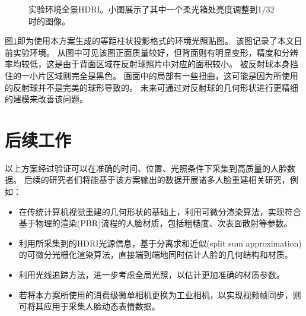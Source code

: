 \begin{figure}
\caption[实验环境全景HDRI]{实验环境全景HDRI。小图展示了其中一个柔光箱处亮度调整到1/32时的图像。}
\label{fig:HDRI}
\end{figure}
图\ref{fig:HDRI}即为使用本方案生成的等距柱状投影格式的环境光照贴图。
该图记录了本文目前实验环境。
从图中可见该图正面质量较好，但背面则有明显变形，精度和分辨率均较低，这是由于背面区域在反射球照片中对应的面积较小。
被反射球本身挡住的一小片区域则完全是黑色。
画面中的局部有一些扭曲，这可能是因为所使用的反射球并不是完美的球形导致的。
未来可通过对反射球的几何形状进行更精细的建模来改善该问题。

\section{后续工作}

以上方案经过验证可以在准确的时间、位置、光照条件下采集到高质量的人脸数据。
后续的研究者们将能基于该方案输出的数据开展诸多人脸重建相关研究，例如：
\begin{itemize}
\item 在传统计算机视觉重建的几何形状的基础上，利用可微分渲染算法，实现符合基于物理的渲染(PBR)流程的人脸材质，包括粗糙度、次表面散射等参数。
\item 利用所采集到的HDRI光源信息，基于分离求和近似(split sum approximation)的可微分光栅化渲染算法，直接端到端地同时估计人脸的几何结构和材质。
\item 利用光线追踪方法，进一步考虑全局光照，以估计更加准确的材质参数。
\item 若将本方案所使用的消费级微单相机更换为工业相机，以实现视频帧同步，则可将其应用于采集人脸动态表情数据。
\end{itemize}

